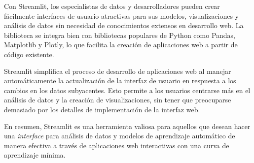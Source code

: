 Con Streamlit, los especialistas de datos y desarrolladores pueden crear fácilmente interfaces de usuario atractivas para sus modelos, visualizaciones y análisis de datos sin necesidad de conocimientos extensos en desarrollo web. La biblioteca se integra bien con bibliotecas populares de Python como Pandas, Matplotlib y Plotly, lo que facilita la creación de aplicaciones web a partir de código existente\cite{Streamlit}.

Streamlit simplifica el proceso de desarrollo de aplicaciones web al manejar automáticamente la actualización de la interfaz de usuario en respuesta a los cambios en los datos subyacentes. Esto permite a los usuarios centrarse más en el análisis de datos y la creación de visualizaciones, sin tener que preocuparse demasiado por los detalles de implementación de la interfaz web.

En resumen, Streamlit es una herramienta valiosa para aquellos que desean hacer una \textit{interface} para análisis de datos y modelos de aprendizaje automático de manera efectiva a través de aplicaciones web interactivas con una curva de aprendizaje mínima.